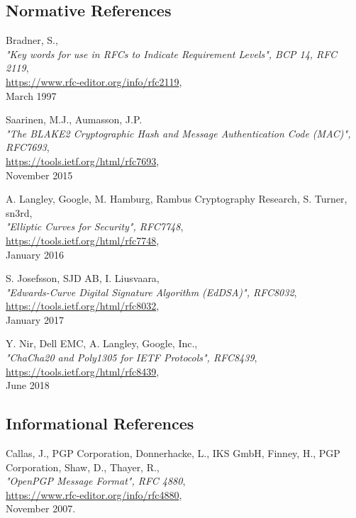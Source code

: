 \documentclass[10pt]{article}
\begin{document}


\begin{thebibliography}{XXXXXXX}

\subsection{Normative References}

  Bradner, S.,\\
  \emph{"Key words for use in RFCs to Indicate Requirement Levels", BCP 14, RFC 2119},\\
  \url{https://www.rfc-editor.org/info/rfc2119},\\
  March 1997

  Saarinen, M.J., Aumasson, J.P.\\
  \emph{"The BLAKE2 Cryptographic Hash and Message Authentication Code (MAC)", RFC7693},\\
  \url{https://tools.ietf.org/html/rfc7693},\\
  November 2015

  A. Langley, Google, M. Hamburg, Rambus Cryptography Research, S. Turner, sn3rd,\\
  \emph{"Elliptic Curves for Security", RFC7748},\\
  \url{https://tools.ietf.org/html/rfc7748},\\
  January 2016

  S. Josefsson, SJD AB, I. Liusvaara,\\
  \emph{"Edwards-Curve Digital Signature Algorithm (EdDSA)", RFC8032},\\
  \url{https://tools.ietf.org/html/rfc8032},\\
  January 2017

  Y. Nir, Dell EMC, A. Langley, Google, Inc.,\\
  \emph{"ChaCha20 and Poly1305 for IETF Protocols", RFC8439},\\
  \url{https://tools.ietf.org/html/rfc8439},\\
  June 2018

\subsection{Informational References}

  Callas, J., PGP Corporation, Donnerhacke, L., IKS GmbH, Finney, H., PGP Corporation, Shaw, D., Thayer, R.,\\
  \emph{"OpenPGP Message Format", RFC 4880},\\
  \url{https://www.rfc-editor.org/info/rfc4880},\\
  November 2007.


\end{thebibliography}
\end{document}
